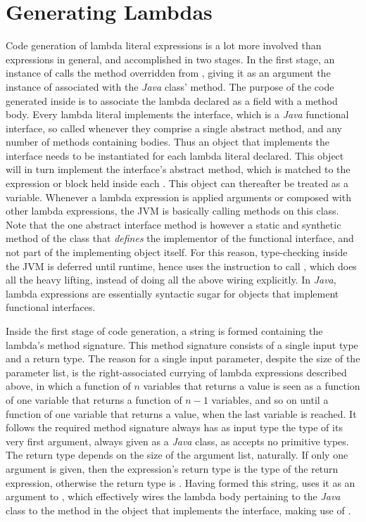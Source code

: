 \section{Generating Lambdas}

Code generation of lambda literal expressions is a lot more involved than expressions in general, and accomplished in two stages. In the first stage, an instance of  calls the  method overridden from , giving it as an argument the instance of  associated with the \emph{Java} class'  method. The purpose of the code generated inside  is to associate the lambda declared as a field with a method body. Every lambda literal implements the  interface, which is a \emph{Java} functional interface, so called whenever they comprise a single abstract method, and any number of methods containing bodies. Thus an object that implements the  interface needs to be instantiated for each lambda literal declared. This object will in turn implement the interface's abstract method, which is matched to the expression or block held inside each . This object can thereafter be treated as a variable. Whenever a lambda expression is applied arguments or composed with other lambda expressions, the JVM is basically calling methods on this class. Note that the one abstract interface method is however a static and synthetic method of the class that \emph{defines} the implementor of the functional interface, and not part of the implementing object itself. For this reason, type-checking inside the JVM is deferred until runtime, hence  uses the  instruction to call , which does all the heavy lifting, instead of doing all the above wiring explicitly. In \emph{Java}, lambda expressions are essentially syntactic sugar for objects that implement functional interfaces.

Inside the first stage of code generation, a string is formed containing the lambda's method signature. This method signature consists of a single input type and a return type. The reason for a single input parameter, despite the size of the parameter list, is the right-associated currying of lambda expressions described above, in which a function of $n$ variables that returns a value is seen as a function of one variable that returns a function of $n - 1$ variables, and so on until a function of one variable that returns a value, when the last variable is reached. It follows the required method signature always has as input type the type of its very first argument, always given as a \emph{Java} class, as  accepts no primitive types. The return type depends on the size of the argument list, naturally. If only one argument is given, then the expression's return type is the type of the return expression, otherwise the return type is . Having formed this string,  uses it as an argument to , which effectively wires the lambda body pertaining to the \emph{Java} class to the  method in the object that implements the  interface, making use of .

